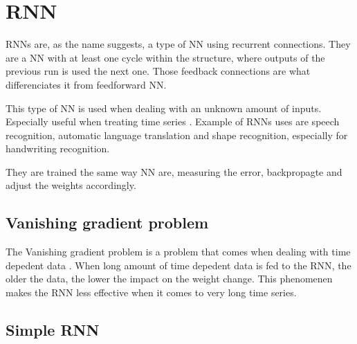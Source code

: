 \section{\acs{RNN}}\label{sec:rnn}

\acp{RNN} are, as the name suggests, a type of \ac{NN} using recurrent connections. They are a \ac{NN} with at least one cycle within the structure, where outputs of the previous run is used the next one. Those feedback connections are what differenciates it from feedforward \ac{NN}.

This type of \ac{NN} is used when dealing with an unknown amount of inputs. Especially useful when treating time series \cite{rnn}. Example of \acp{RNN} uses are speech recognition, automatic language translation \cite{gru} and shape recognition, especially for handwriting recognition.

They are trained the same way \ac{NN} are, measuring the error, backpropagte and adjust the weights accordingly.

\subsection{Vanishing gradient problem}

The Vanishing gradient problem is a problem that comes when dealing with time depedent data \cite{vanishGrad}. When long amount of time depedent data is fed to the \ac{RNN}, the older the data, the lower the impact on the weight change. This phenomenen makes the \ac{RNN} less effective when it comes to very long time series.


\subsection{Simple \ac{RNN}}
